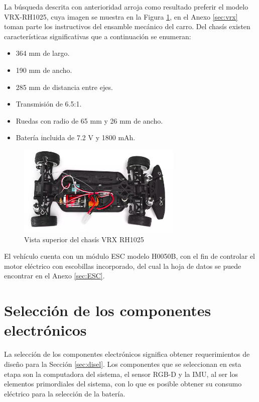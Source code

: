 \par La búsqueda descrita con anterioridad arroja como resultado preferir el modelo VRX-RH1025, cuya imagen se muestra en la Figura \ref{fig:chasis}, en el Anexo \ref{sec:vrx} toman parte los instructivos del ensamble mecánico del carro. Del chasís existen características significativas que a continuación se enumeran:
\begin{itemize}
	\item 364 mm de largo.
	\item 190 mm de ancho.
	\item 285 mm de distancia entre ejes.
	\item Transmisión de 6.5:1.
	\item Ruedas con radio de 65 mm y 26 mm de ancho.
	\item Batería incluida de 7.2 V y 1800 mAh.
\end{itemize}
\begin{figure}[htbp!]
	\centering
	\includegraphics[width=0.7\textwidth]{./Figuras/Chasis}
	\caption{Vista superior del chasís VRX RH1025}
	\label{fig:chasis}
\end{figure}
\par El vehículo cuenta con un módulo ESC modelo H0050B, con el fin de controlar el motor eléctrico con escobillas incorporado, del cual la hoja de datos se puede encontrar en el Anexo \ref{sec:ESC}.
\section{Selección de los componentes electrónicos}
\label{sec:selcomp}
La selección de los componentes electrónicos significa obtener requerimientos de diseño para la Sección \ref{sec:disel}. Los componentes que se seleccionan en esta etapa son la computadora del sistema, el sensor RGB-D y la IMU, al ser los elementos primordiales del sistema, con lo que es posible obtener su consumo eléctrico para la selección de la batería.
